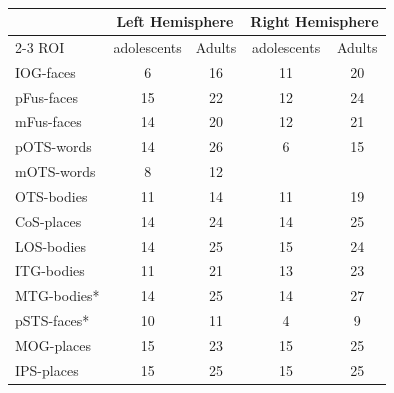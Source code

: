 \begin{table}
\centering
\caption{}
\centering
\begin{tabular}[t]{l|c|c|c|c}
\hline
\multicolumn{1}{c|}{ } & \multicolumn{2}{c|}{Left Hemisphere} & \multicolumn{2}{c}{Right Hemisphere} \\
\cline{2-3} \cline{4-5}
ROI & adolescents & Adults & adolescents & Adults\\
\hline
IOG-faces & 6 & 16 & 11 & 20\\
\hline
pFus-faces & 15 & 22 & 12 & 24\\
\hline
mFus-faces & 14 & 20 & 12 & 21\\
\hline
pOTS-words & 14 & 26 & 6 & 15\\
\hline
mOTS-words & 8 & 12 &  & \\
\hline
OTS-bodies & 11 & 14 & 11 & 19\\
\hline
CoS-places & 14 & 24 & 14 & 25\\
\hline
LOS-bodies & 14 & 25 & 15 & 24\\
\hline
ITG-bodies & 11 & 21 & 13 & 23\\
\hline
MTG-bodies* & 14 & 25 & 14 & 27\\
\hline
pSTS-faces* & 10 & 11 & 4 & 9\\
\hline
MOG-places & 15 & 23 & 15 & 25\\
\hline
IPS-places & 15 & 25 & 15 & 25\\
\hline
\end{tabular}
\end{table}
